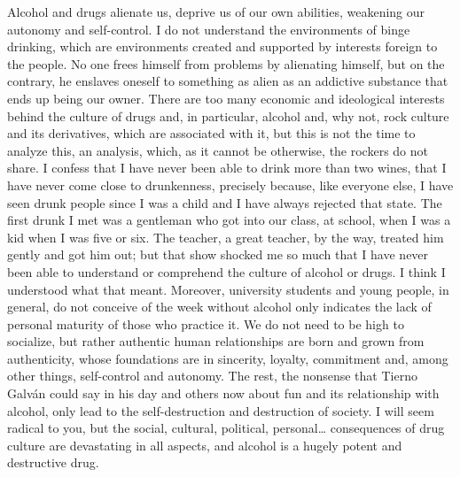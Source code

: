 \documentclass[]{book}
\begin{document}
Alcohol and drugs alienate us, deprive us of our own abilities, weakening our autonomy and self-control. I do not understand the environments of binge drinking, which are environments created and supported by interests foreign to the people. No one frees himself from problems by alienating himself, but on the contrary, he enslaves oneself to something as alien as an addictive substance that ends up being our owner. There are too many economic and ideological interests behind the culture of drugs and, in particular, alcohol and, why not, rock culture and its derivatives, which are associated with it, but this is not the time to analyze this, an analysis, which, as it cannot be otherwise, the rockers do not share. I confess that I have never been able to drink more than two wines, that I have never come close to drunkenness, precisely because, like everyone else, I have seen drunk people since I was a child and I have always rejected that state. The first drunk I met was a gentleman who got into our class, at school, when I was a kid when I was five or six. The teacher, a great teacher, by the way, treated him gently and got him out; but that show shocked me so much that I have never been able to understand or comprehend the culture of alcohol or drugs. I think I understood what that meant. Moreover, university students and young people, in general, do not conceive of the week without alcohol only indicates the lack of personal maturity of those who practice it. We do not need to be high to socialize, but rather authentic human relationships are born and grown from authenticity, whose foundations are in sincerity, loyalty, commitment and, among other things, self-control and autonomy. The rest, the nonsense that Tierno Galván could say in his day and others now about fun and its relationship with alcohol, only lead to the self-destruction and destruction of society. I will seem radical to you, but the social, cultural, political, personal\ldots{} consequences of drug culture are devastating in all aspects, and alcohol is a hugely potent and destructive drug.
\end{document}
